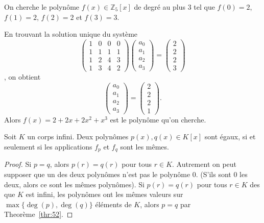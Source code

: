 \begin{example}
  \label{exe:38}
  On cherche le polynôme $f(x) ∈ ℤ_5[x]$ de degré au plus $3$ tel que
  $f(0) = 2$, $f(1)=2$, $f(2) = 2$ et $f(3) = 3$.

  En trouvant la solution unique du système
  \begin{displaymath}
    \left(\begin{array}{rrrr}
1 & 0 & 0 & 0 \\
1 & 1 & 1 & 1 \\
1 & 2 & 4 & 3 \\
1 & 3 & 4 & 2
\end{array}\right)
\begin{pmatrix}
  a_0 \\ a_1 \\ a_2 \\ a_3
\end{pmatrix}
=
\begin{pmatrix}
  2 \\ 2 \\ 2 \\3
\end{pmatrix}
\end{displaymath}, on obtient
\begin{displaymath}
  \begin{pmatrix}
  a_0 \\ a_1 \\ a_2 \\ a_3
\end{pmatrix} =
\begin{pmatrix}
  2 \\ 2 \\ 2 \\ 1
\end{pmatrix}.
\end{displaymath}
Alors $f(x) = 2 + 2x + 2x^2 + x^3$ est le polynôme qu'on cherche. 

\end{example}


\begin{corollary}
  \label{thr:42}
  Soit $K$ un corps infini. Deux polynômes $p(x),q(x) ∈ K[x]$ sont égaux, si et seulement si les applications $f_p$ et $f_q$ sont les mêmes.
\end{corollary}
\begin{proof}
  Si $p = q$, alors $p(r) = q(r)$ pour tous $r ∈K$. Autrement on peut supposer  que un des deux polynômes n'est pas le polynôme $0$. (S'ils sont $0$ les deux, alors ce sont les mêmes polynômes).  Si $p(r) = q(r)$ pour tous $r ∈K$ des que $K$ est infini, les polynômes ont les mêmes valeurs sur $\max\{\deg(p),\deg(q)\}$ éléments de $K$, alors $p = q$ par Theorème~\ref{thr:52}. 
\end{proof}


